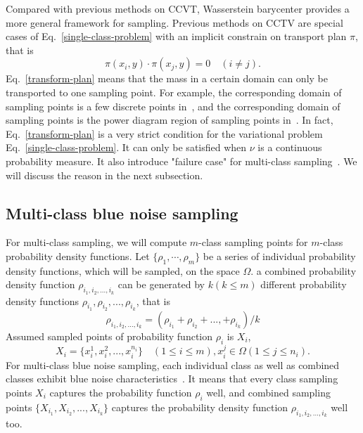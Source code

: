 Compared with previous methods on CCVT,
Wasserstein barycenter provides a more general framework for sampling.
Previous methods on CCTV are special cases of Eq.~\ref{single-class-problem} with an implicit constrain on  transport plan $\pi$,
that is
\begin{equation}\label{eq:transform-plan}
  \pi(x_i,y)\cdot\pi(x_j,y)=0 \quad(i\neq j).
\end{equation}
Eq.~\ref{transform-plan} means that the mass in a certain domain can only be transported to one sampling point.
For example,
the corresponding domain of sampling points is a few discrete points in~\cite{balzer:2009:capacity},
and the corresponding domain of sampling points is the power diagram region of sampling points in~\cite{de:2012:blue}.
In fact,
Eq.~\ref{transform-plan} is a very strict condition for the variational problem Eq.~\ref{single-class-problem}.
It can only be satisfied when $\nu$ is a continuous probability measure.
It also introduce "failure case" for multi-class sampling~\cite{wei:2010:multi}.
We will discuss the reason in the next subsection.

\subsection{Multi-class blue noise sampling}
For multi-class sampling,
we will compute $m$-class sampling points for $m$-class probability density functions.
Let $\{\rho_1,\cdots,\rho_m\}$ be a series of individual probability density functions,
which will be sampled, on the space $\Omega$.
a combined probability density function $\rho_{i_1,i_2,...,i_k}$ can be generated by $k(k\leq m)$ different probability density functions $\rho_{i_1},\rho_{i_2},...,\rho_{i_k}$,
that is
\begin{equation*}
\rho_{i_1,i_2,...,i_k}=(\rho_{i_1}+\rho_{i_2}+...,+\rho_{i_k})/k
\end{equation*}
Assumed sampled points of probability function $\rho_i$ is $X_i$,
\begin{equation*}
  X_i=\{x_i^1,x_i^2,...,x_i^{n_i}\}\quad(1\leq i\leq m), x_i^j\in\Omega(1\leq j\leq n_i).
\end{equation*}
For multi-class blue noise sampling,
each individual class as well as combined classes exhibit blue noise characteristics~\cite{wei:2010:multi}.
It means that every class sampling points $X_i$ captures the probability function $\rho_i$ well,
and combined sampling points $\{X_{i_1}, X_{i_2},...,X_{i_k}\}$ captures the probability density function $\rho_{i_1,i_2,...,i_k}$ well too.

